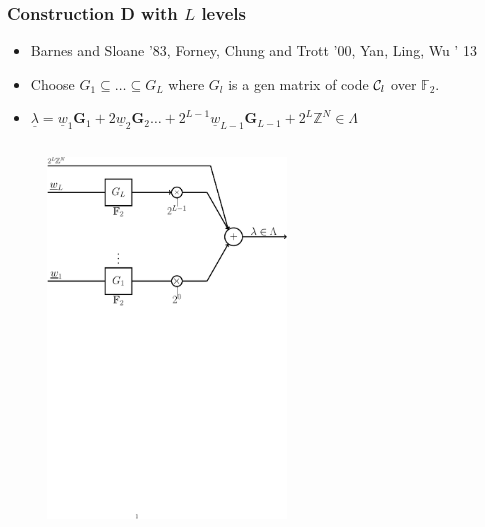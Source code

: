 \documentclass[10pt,presentation]{beamer}
\def\patha{../SCLDPC-lattices}
\begin{document}
\begin{frame}\frametitle{Construction D with $L$ levels}
\begin{itemize}
    \item Barnes and Sloane '83, Forney, Chung and Trott '00, Yan, Ling, Wu ' 13
				 \vspace{0.5em}
	 \item Choose  $G_{1}\subseteq \ldots \subseteq G_{L}$ where $G_{l}$ is a gen matrix of code $\mathcal{C}_{l}$ over $\mathbb{F}_{2}$.
				 \vspace{.5em}
	\item<2->  $  \underline{\lambda} = \underline{w}_1 \mathbf{G}_1 + 2 \underline{w}_2 \mathbf{G}_2 \ldots +2^{L-1} \underline{w}_{L-1} \mathbf{G}_{L-1} +2^{L}\mathbb{Z}^{N} \in \Lambda$
\end{itemize}
				\vspace{0.2in}
    \begin{columns}[t]      
 	      \begin{column}{0.6\textwidth}
			\onslide<2->	{
            \begin{figure}
			\includegraphics[width=2.5in]{lattice_Constr_D1.pdf}
            \end{figure}
            			}
        \end{column}

\begin{column}{0.39\textwidth}
	\begin{figure}
	\end{figure}
\end{column}
    \end{columns}    
\end{frame}
\end{document}

